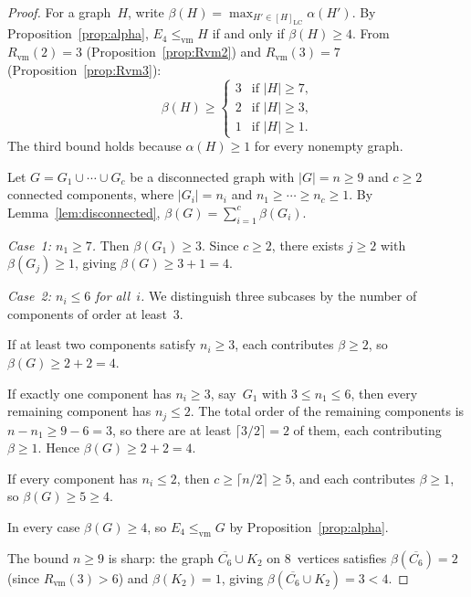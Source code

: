 \documentclass[10pt,a4paper]{amsart}
\newcommand{\LC}{\mathrm{LC}}
\newcommand{\Rvm}{R_{\mathrm{vm}}}
\newcommand{\vm}{\leq_{\mathrm{vm}}}
\begin{document}
\begin{proof}
  For a graph~$H$, write
  $\beta(H)=\max_{H'\in[H]_{\LC}}\alpha(H')$.  By
  Proposition~\ref{prop:alpha}, $E_4\vm H$ if and only if
  $\beta(H)\geq 4$.  From $\Rvm(2)=3$
  (Proposition~\ref{prop:Rvm2}) and $\Rvm(3)=7$
  (Proposition~\ref{prop:Rvm3}):
  \[
    \beta(H)\geq
    \begin{cases}
      3 & \text{if $|H|\geq 7$,}\\
      2 & \text{if $|H|\geq 3$,}\\
      1 & \text{if $|H|\geq 1$.}
    \end{cases}
  \]
  The third bound holds because $\alpha(H)\geq 1$ for every nonempty
  graph.

  Let $G=G_1\cup\cdots\cup G_c$ be a disconnected graph with
  $|G|=n\geq 9$ and $c\geq 2$ connected components, where
  $|G_i|=n_i$ and $n_1\geq\cdots\geq n_c\geq 1$.  By
  Lemma~\ref{lem:disconnected},
  $\beta(G)=\sum_{i=1}^{c}\beta(G_i)$.

  \smallskip
  \emph{Case~1: $n_1\geq 7$.}
  Then $\beta(G_1)\geq 3$.  Since $c\geq 2$, there exists $j\geq 2$
  with $\beta(G_j)\geq 1$, giving $\beta(G)\geq 3+1=4$.

  \smallskip
  \emph{Case~2: $n_i\leq 6$ for all~$i$.}
  We distinguish three subcases by the number of components of order
  at least~$3$.

  If at least two components satisfy $n_i\geq 3$, each contributes
  $\beta\geq 2$, so $\beta(G)\geq 2+2=4$.

  If exactly one component has $n_i\geq 3$, say~$G_1$ with
  $3\leq n_1\leq 6$, then every remaining component has $n_j\leq 2$.
  The total order of the remaining components is
  $n-n_1\geq 9-6=3$, so there are at least
  $\lceil 3/2\rceil=2$ of them, each contributing $\beta\geq 1$.
  Hence $\beta(G)\geq 2+2=4$.

  If every component has $n_i\leq 2$, then
  $c\geq\lceil n/2\rceil\geq 5$, and each contributes $\beta\geq 1$,
  so $\beta(G)\geq 5\geq 4$.

  \smallskip
  In every case $\beta(G)\geq 4$, so $E_4\vm G$ by
  Proposition~\ref{prop:alpha}.

  \smallskip
  The bound $n\geq 9$ is sharp: the graph
  $\overline{C_6}\cup K_2$ on $8$~vertices satisfies
  $\beta(\overline{C_6})=2$ (since $\Rvm(3)>6$) and
  $\beta(K_2)=1$, giving
  $\beta(\overline{C_6}\cup K_2)=3<4$.
\end{proof}
\end{document}
